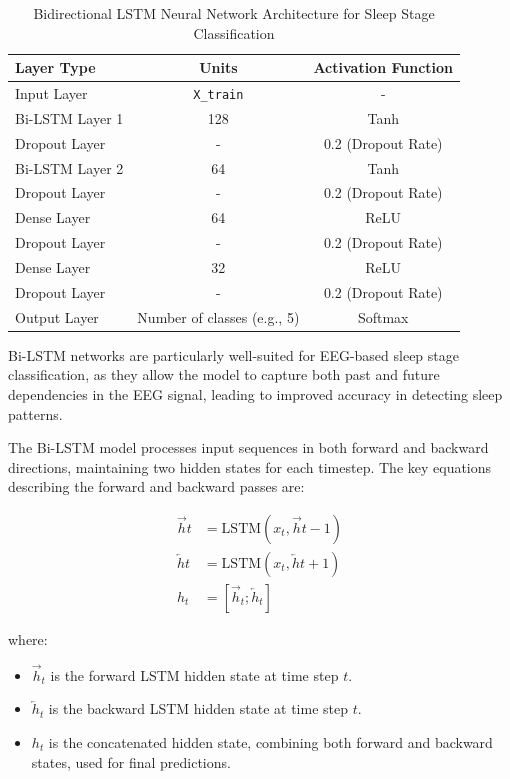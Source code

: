 \begin{table}[!h]
	\centering
	\caption{Bidirectional LSTM Neural Network Architecture for Sleep Stage Classification}
	\label{tab:bi_lstm_architecture}
	\begin{tabular}{lcc}
		\hline
		\textbf{Layer Type} & \textbf{Units} & \textbf{Activation Function} \\
		\hline
		Input Layer         & \texttt{X\_train}            & - \\
		Bi-LSTM Layer 1     & 128                          & Tanh \\
		Dropout Layer       & -                            & 0.2 (Dropout Rate) \\
		Bi-LSTM Layer 2     & 64                           & Tanh \\
		Dropout Layer       & -                            & 0.2 (Dropout Rate) \\
		Dense Layer         & 64                           & ReLU \\
		Dropout Layer       & -                            & 0.2 (Dropout Rate) \\
		Dense Layer         & 32                           & ReLU \\
		Dropout Layer       & -                            & 0.2 (Dropout Rate) \\
		Output Layer        & Number of classes (e.g., 5)  & Softmax \\
		\hline
	\end{tabular}
\end{table}

Bi-LSTM networks are particularly well-suited for EEG-based sleep stage classification, as they allow the model to capture both past and future dependencies in the EEG signal, leading to improved accuracy in detecting sleep patterns.

The Bi-LSTM model processes input sequences in both forward and backward directions, maintaining two hidden states for each timestep. The key equations describing the forward and backward passes are:

\begin{align}
	\overrightarrow{h}t &= \text{LSTM}(x_t, \overrightarrow{h}{t-1}) \\
	\overleftarrow{h}t &= \text{LSTM}(x_t, \overleftarrow{h}{t+1}) \\
	h_t &= [\overrightarrow{h}_t; \overleftarrow{h}_t]
\end{align}

where:
\begin{itemize}
	\item \( \overrightarrow{h}_t \) is the forward LSTM hidden state at time step \( t \).
	\item \( \overleftarrow{h}_t \) is the backward LSTM hidden state at time step \( t \).
	\item \( h_t \) is the concatenated hidden state, combining both forward and backward states, used for final predictions.
\end{itemize}








